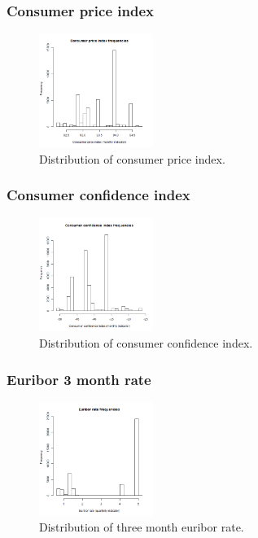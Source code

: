 \documentclass[11pt]{article}
\begin{document}
\begin{multicols}{2}
\subsubsection{Consumer price index}
\begin{figure}[H]
	\centering
	\includegraphics[width=0.33\textwidth]{images/consumer_price_index}
	\caption{Distribution of consumer price index.}
	\label{fig:cons_price_idx}
\end{figure}

\subsubsection{Consumer confidence index}
\begin{figure}[H]
	\centering
	\includegraphics[width=0.33\textwidth]{images/consumer_confidence_index}
	\caption{Distribution of consumer confidence index.}
	\label{fig:cons_conf_idx}
\end{figure}

\subsubsection{Euribor 3 month rate}
\begin{figure}[H]
	\centering
	\includegraphics[width=0.33\textwidth]{images/euribor3m}
	\caption{Distribution of three month euribor rate.}
	\label{fig:euribor3m}
\end{figure}


\end{multicols}
\end{document}
